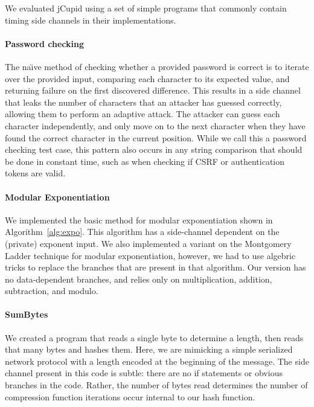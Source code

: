 

We evaluated jCupid using a set of simple programs that commonly contain timing
side channels in their implementations.


\paragraph{Password checking}
The na\"{\i}ve method of checking whether a provided password is correct is to iterate
over the provided input, comparing each character to its expected value, and
returning failure on the first discovered difference. This results in a side
channel that leaks the number of characters that an attacker has guessed
correctly, allowing them to perform an adaptive attack. The attacker can guess
each character independently, and only move on to the next character when they
have found the correct character in the current position. While we call this a
password checking test case, this pattern also occurs in any string comparison
that should be done in constant time, such as when checking if CSRF or
authentication tokens are valid.


\paragraph{Modular Exponentiation}
We implemented the basic method for modular exponentiation shown in
Algorithm~\ref{alg:expo}. This algorithm has a side-channel dependent on the
(private) exponent input. We also implemented a variant on the Montgomery Ladder
technique for modular exponentiation, however, we had to use algebric tricks to
replace the branches that are present in that algorithm. Our version has no
data-dependent branches, and relies only on multiplication, addition,
subtraction, and modulo.


\paragraph{SumBytes}
We created a program that reads a single byte to determine a length, then reads
that many bytes and hashes them. Here, we are mimicking a simple serialized
network protocol with a length encoded at the beginning of the message. The side
channel present in this code is subtle: there are no if statements or obvious
branches in the code. Rather, the number of bytes read determines the number of
compression function iterations occur internal to our hash function.

